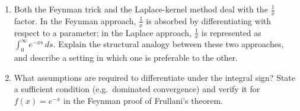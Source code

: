\begin{enumerate}

  \item Both the Feynman trick and the Laplace-kernel method deal with the \(\tfrac{1}{x}\) factor. In the Feynman approach, \(\tfrac{1}{x}\) is absorbed by differentiating with respect to a parameter; in the Laplace approach, \(\tfrac{1}{x}\) is represented as \(\int_{0}^{\infty} e^{-xs}\,ds\). Explain the structural analogy between these two approaches, and describe a setting in which one is preferable to the other.


  \item What assumptions are required to differentiate under the integral sign? State a sufficient condition (e.g.\ dominated convergence) and verify it for \(f(x) = e^{-x}\) in the Feynman proof of Frullani's theorem.
\end{enumerate}
